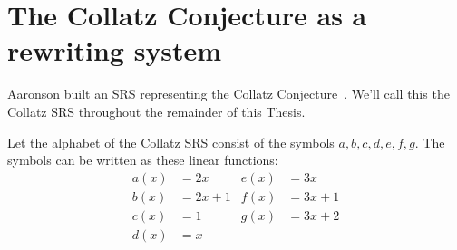 \section{The Collatz Conjecture as a rewriting system} \label{subsec:CollatzSRS}
Aaronson built an SRS representing the Collatz Conjecture~\cite{HeuleAaronson}. We'll call this the Collatz SRS throughout the remainder of this Thesis. \par
Let the alphabet of the Collatz SRS consist of the symbols $a, b, c, d, e, f, g$. The symbols can be written as these linear functions:
\begin{align*}
  a(x) &= 2x & e(x) &= 3x \\
  b(x) &= 2x+1 & f(x) &= 3x+1 \\
  c(x) &= 1 & g(x) &= 3x+2 \\
  d(x) &= x & & 
\end{align*}


